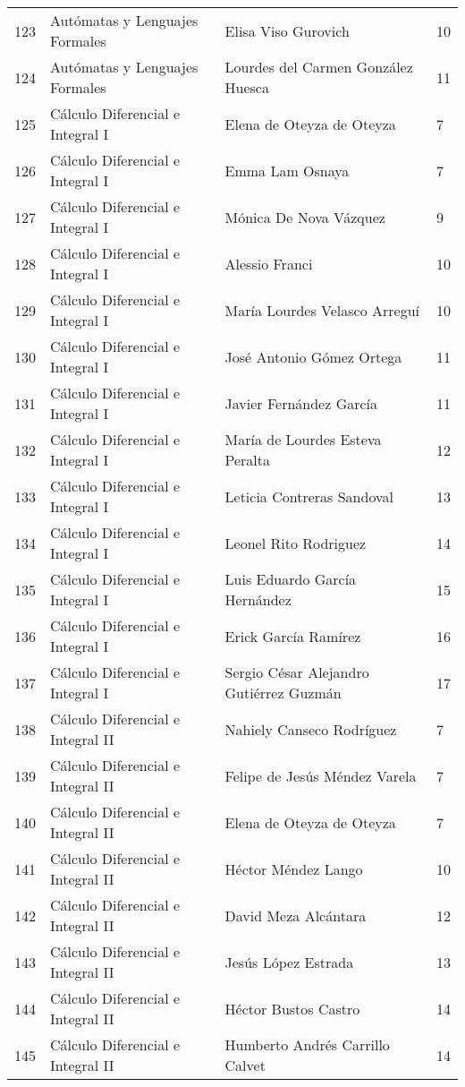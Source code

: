\begin{table}[ht]
\begin{tabular}{rlll}
  123 & Autómatas y Lenguajes Formales & Elisa Viso Gurovich & 10 \\ 
  124 & Autómatas y Lenguajes Formales & Lourdes del Carmen González Huesca & 11 \\ 
  125 & Cálculo Diferencial e Integral I & Elena de Oteyza de Oteyza & 7 \\ 
  126 & Cálculo Diferencial e Integral I & Emma Lam Osnaya & 7 \\ 
  127 & Cálculo Diferencial e Integral I & Mónica De Nova Vázquez & 9 \\ 
  128 & Cálculo Diferencial e Integral I & Alessio Franci & 10 \\ 
  129 & Cálculo Diferencial e Integral I & María Lourdes Velasco Arreguí & 10 \\ 
  130 & Cálculo Diferencial e Integral I & José Antonio Gómez Ortega & 11 \\ 
  131 & Cálculo Diferencial e Integral I & Javier Fernández García & 11 \\ 
  132 & Cálculo Diferencial e Integral I & María de Lourdes Esteva Peralta & 12 \\ 
  133 & Cálculo Diferencial e Integral I & Leticia Contreras Sandoval & 13 \\ 
  134 & Cálculo Diferencial e Integral I & Leonel Rito Rodriguez & 14 \\ 
  135 & Cálculo Diferencial e Integral I & Luis Eduardo García Hernández & 15 \\ 
  136 & Cálculo Diferencial e Integral I & Erick García Ramírez & 16 \\ 
  137 & Cálculo Diferencial e Integral I & Sergio César Alejandro Gutiérrez Guzmán & 17 \\ 
  138 & Cálculo Diferencial e Integral II & Nahiely Canseco Rodríguez & 7 \\ 
  139 & Cálculo Diferencial e Integral II & Felipe de Jesús Méndez Varela & 7 \\ 
  140 & Cálculo Diferencial e Integral II & Elena de Oteyza de Oteyza & 7 \\ 
  141 & Cálculo Diferencial e Integral II & Héctor Méndez Lango & 10 \\ 
  142 & Cálculo Diferencial e Integral II & David Meza Alcántara & 12 \\ 
  143 & Cálculo Diferencial e Integral II & Jesús López Estrada & 13 \\ 
  144 & Cálculo Diferencial e Integral II & Héctor Bustos Castro & 14 \\ 
  145 & Cálculo Diferencial e Integral II & Humberto Andrés Carrillo Calvet & 14 \\ 

\end{tabular}
\end{table}

